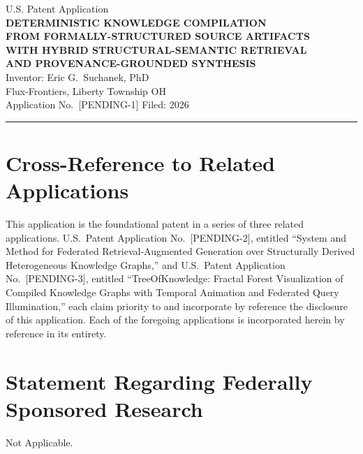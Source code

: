 \documentclass[12pt]{article}
\begin{document}

\begin{center}
  {\small U.S. Patent Application}\\[6pt]
  {\LARGE\bfseries DETERMINISTIC KNOWLEDGE COMPILATION\\
  FROM FORMALLY-STRUCTURED SOURCE ARTIFACTS\\
  WITH HYBRID STRUCTURAL-SEMANTIC RETRIEVAL\\
  AND PROVENANCE-GROUNDED SYNTHESIS}\\[12pt]
  {\normalsize Inventor: Eric G.\ Suchanek, PhD\\
  Flux-Frontiers, Liberty Township OH}\\[4pt]
  {\small Application No.\ [PENDING-1] \quad Filed: 2026}
\end{center}

\vspace{1em}\hrule\vspace{1em}

\section*{Cross-Reference to Related Applications}

This application is the foundational patent in a series of three related
applications. U.S.\ Patent Application No.\ [PENDING-2], entitled ``System and
Method for Federated Retrieval-Augmented Generation over Structurally Derived
Heterogeneous Knowledge Graphs,'' and U.S.\ Patent Application No.\
[PENDING-3], entitled ``TreeOfKnowledge: Fractal Forest Visualization of
Compiled Knowledge Graphs with Temporal Animation and Federated Query
Illumination,'' each claim priority to and incorporate by reference the
disclosure of this application. Each of the foregoing applications is
incorporated herein by reference in its entirety.

\section*{Statement Regarding Federally Sponsored Research}

Not Applicable.
\end{document}

